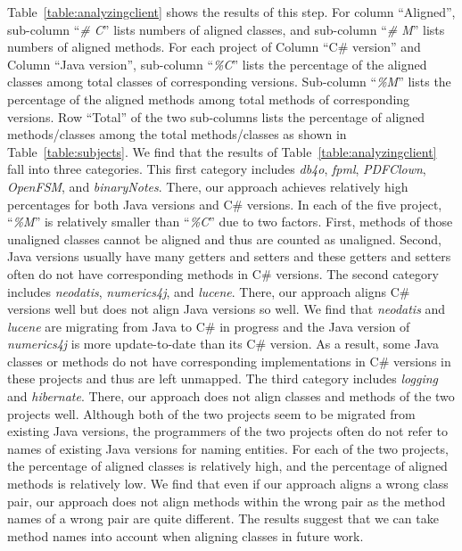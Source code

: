 Table~\ref{table:analyzingclient} shows the results of this step.
For column ``Aligned'', sub-column ``\emph{\# C}'' lists numbers of
aligned classes, and sub-column ``\emph{\# M}'' lists numbers of
aligned methods. For each project of Column ``C\# version'' and
Column ``Java version'', sub-column ``\emph{\%C}'' lists the
percentage of the aligned classes among total classes of
corresponding versions. Sub-column ``\emph{\%M}'' lists the
percentage of the aligned methods among total methods of
corresponding versions. Row ``Total'' of the two sub-columns lists
the percentage of aligned methods/classes among the total
methods/classes as shown in Table~\ref{table:subjects}. We find that
the results of Table~\ref{table:analyzingclient} fall into three
categories. This first category includes \emph{db4o}, \emph{fpml},
\emph{PDFClown}, \emph{OpenFSM}, and \emph{binaryNotes}. There, our
approach achieves relatively high percentages for both Java versions
and C\# versions. In each of the five project, ``\emph{\%M}'' is
relatively smaller than ``\emph{\%C}'' due to two factors. First,
methods of those unaligned classes cannot be aligned and thus are
counted as unaligned. Second, Java versions usually have many
getters and setters and these getters and setters often do not have
corresponding methods in C\# versions. The second category includes
\emph{neodatis}, \emph{numerics4j}, and \emph{lucene}. There, our
approach aligns C\# versions well but does not align Java versions
so well. We find that \emph{neodatis} and \emph{lucene} are
migrating from Java to C\# in progress and the Java version of
\emph{numerics4j} is more update-to-date than its C\# version. As a
result, some Java classes or methods do not have corresponding
implementations in C\# versions in these projects and thus are left
unmapped. The third category includes \emph{logging} and
\emph{hibernate}. There, our approach does not align classes and
methods of the two projects well. Although both of the two projects
seem to be migrated from existing Java versions, the programmers of
the two projects often do not refer to names of existing Java
versions for naming entities. For each of the two projects, the
percentage of aligned classes is relatively high, and the percentage
of aligned methods is relatively low. We find that even if our
approach aligns a wrong class pair, our approach does not align
methods within the wrong pair as the method names of a wrong pair
are quite different. The results suggest that we can take method
names into account when aligning classes in future work.

